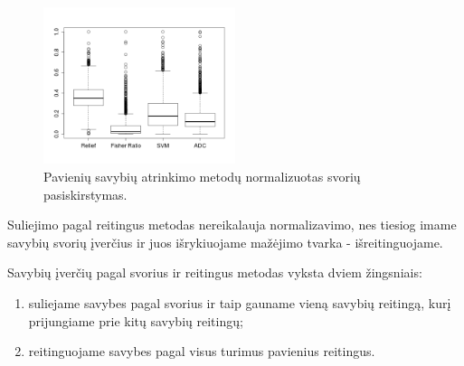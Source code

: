 \begin{figure}[htb]
\begin{center}
\leavevmode
\includegraphics[width=0.5\textwidth]{images/boxplot_colon_all_normalized.png}
\end{center}
\caption{Pavienių savybių atrinkimo metodų normalizuotas svorių
pasiskirstymas.}
\label{fig:flash}
\end{figure}

Suliejimo pagal reitingus metodas nereikalauja normalizavimo, nes tiesiog imame
savybių svorių įverčius ir juos išrykiuojame mažėjimo tvarka - išreitinguojame.

Savybių įverčių pagal svorius ir reitingus metodas vyksta dviem žingsniais:
\begin{enumerate}
  \item suliejame savybes pagal svorius ir taip gauname vieną savybių reitingą,
  kurį prijungiame prie kitų savybių reitingų;
  \item reitinguojame savybes pagal visus turimus pavienius reitingus.
\end{enumerate} 

